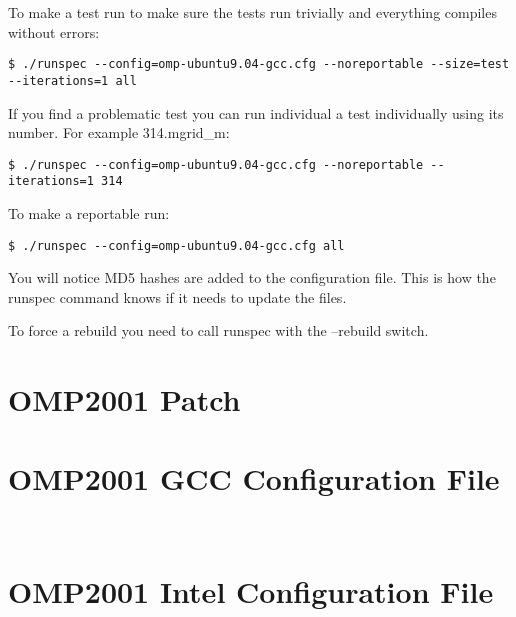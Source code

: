 \documentclass[12pt,twoside,a4paper]{article}
\begin{document}
To make a test run to make sure the tests run trivially and everything compiles without errors:
\begin{verbatim}
$ ./runspec --config=omp-ubuntu9.04-gcc.cfg --noreportable --size=test --iterations=1 all
\end{verbatim}

If you find a problematic test you can run individual a test individually using its number. For example 314.mgrid\_m:
\begin{verbatim}
$ ./runspec --config=omp-ubuntu9.04-gcc.cfg --noreportable --iterations=1 314
\end{verbatim}

To make a reportable run:
\begin{verbatim}
$ ./runspec --config=omp-ubuntu9.04-gcc.cfg all
\end{verbatim}

You will notice MD5 hashes are added to the configuration file. This is how the runspec command knows if it needs to update the files.

To force a rebuild you need to call runspec with the --rebuild switch.

\appendix
{}

\section{OMP2001 Patch}

\section{OMP2001 GCC Configuration File}
\tt{}
\section{OMP2001 Intel Configuration File}
\tt{}
\end{document}
